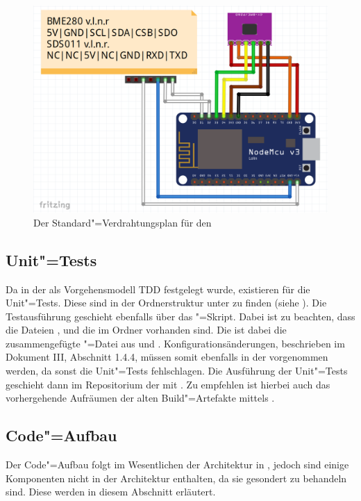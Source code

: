 \begin{figure}[htb]
	\centering
	\includegraphics[width=0.7\linewidth]{./ressourcen/Prod_Verdrahtungsplan}
	\caption{Der Standard"=Verdrahtungsplan für den \sk}
	\label{fig:skwiringdefault}
\end{figure}

\subsection{Unit"=Tests}
Da in der \pg als Vorgehensmodell TDD festgelegt wurde, existieren für die \skfw Unit"=Tests.
Diese sind in der Ordnerstruktur unter  zu finden (siehe ).
Die Testausführung geschieht ebenfalls über das "=Skript.
Dabei ist zu beachten, dass die Dateien ,  und die  im Ordner  vorhanden sind.
Die  ist dabei die zusammengefügte "=Datei aus  und .
Konfigurationsänderungen, beschrieben im Dokument III, Abschnitt 1.4.4, müssen somit ebenfalls in der  vorgenommen werden, da sonst die Unit"=Tests fehlschlagen.
Die Ausführung der Unit"=Tests geschieht dann im Repositorium der \skfw mit .
Zu empfehlen ist hierbei auch das vorhergehende Aufräumen der alten Build"=Artefakte mittels .

\subsection{Code"=Aufbau}
Der Code"=Aufbau folgt im Wesentlichen der Architektur in , jedoch sind einige Komponenten nicht in der Architektur enthalten, da sie gesondert zu behandeln sind.
Diese werden in diesem Abschnitt erläutert.

